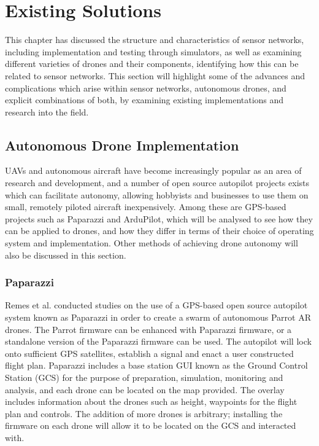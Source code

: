 \section{Existing Solutions}
This chapter has discussed the structure and characteristics of sensor networks, including implementation and testing through simulators, as well as examining different varieties of drones and their components, identifying how this can be related to sensor networks. This section will highlight some of the advances and complications which arise within sensor networks, autonomous drones, and explicit combinations of both, by examining existing implementations and research into the field.

\subsection{Autonomous Drone Implementation}
UAVs and autonomous aircraft have become increasingly popular as an area of research and development, and a number of open source autopilot projects exists which can facilitate autonomy, allowing hobbyists and businesses to use them on small, remotely piloted aircraft inexpensively. Among these are GPS-based projects such as Paparazzi and ArduPilot, which will be analysed to see how they can be applied to drones, and how they differ in terms of their choice of operating system and implementation. Other methods of achieving drone autonomy will also be discussed in this section.

\subsubsection{Paparazzi}
Remes et al. \cite{bartremes13} conducted studies on the use of a GPS-based open source autopilot system known as Paparazzi in order to create a swarm of autonomous Parrot AR drones. The Parrot firmware can be enhanced with Paparazzi firmware, or a standalone version of the Paparazzi firmware can be used. The autopilot will lock onto sufficient GPS satellites, establish a signal and enact a user constructed flight plan.
Paparazzi includes a base station GUI known as the Ground Control Station (GCS) for the purpose of preparation, simulation, monitoring and analysis, and each drone can be located on the map provided.  The overlay includes information about the drones such as height, waypoints for the flight plan and controls. The addition of more drones is arbitrary; installing the firmware on each drone will allow it to be located on the GCS and interacted with. 


